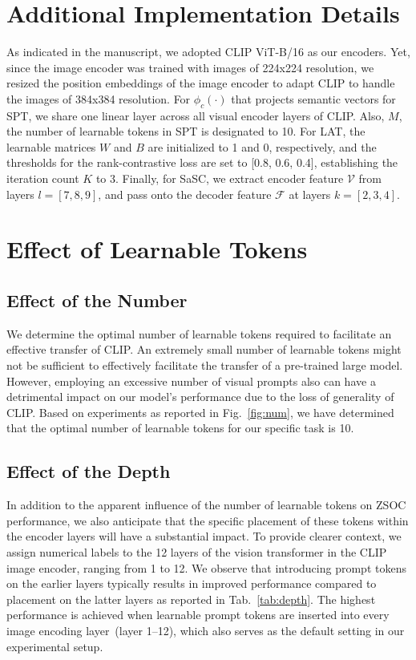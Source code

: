 \appendix

\section{Additional Implementation Details}
As indicated in the manuscript, we adopted CLIP ViT-B/16 as our encoders.
Yet, since the image encoder was trained with images of 224x224 resolution, we resized the position embeddings of the image encoder to adapt CLIP to handle the images of 384x384 resolution.
For $\phi_c(\cdot)$ that projects semantic vectors for SPT, we share one linear layer across all visual encoder layers of CLIP.
Also, $M$, the number of learnable tokens in SPT is designated to 10.
For LAT, the learnable matrices $W$ and $B$ are initialized to 1 and 0, respectively, and the thresholds for the rank-contrastive loss are set to [0.8, 0.6, 0.4], establishing the iteration count $K$ to 3.
Finally, for SaSC, we extract encoder feature $\mathcal{V}$ from layers $l = [7,8,9]$, and pass onto the decoder feature $\mathcal{F}$ at layers $k = [2,3,4]$.


\section{Effect of Learnable Tokens}

\subsection{Effect of the Number}
We determine the optimal number of learnable tokens required to facilitate an effective transfer of CLIP.
An extremely small number of learnable tokens might not be sufficient to effectively facilitate the transfer of a pre-trained large model.
However, employing an excessive number of visual prompts also can have a detrimental impact on our model's performance due to the loss of generality of CLIP.
Based on experiments as reported in Fig.~\ref{fig:num}, we have determined that the optimal number of learnable tokens for our specific task is 10.

\subsection{Effect of the Depth}
In addition to the apparent influence of the number of learnable tokens on ZSOC performance, we also anticipate that the specific placement of these tokens within the encoder layers will have a substantial impact.
To provide clearer context, we assign numerical labels to the 12 layers of the vision transformer in the CLIP image encoder, ranging from 1 to 12.
We observe that introducing prompt tokens on the earlier layers typically results in improved performance compared to placement on the latter layers as reported in Tab.~\ref{tab:depth}.
The highest performance is achieved when learnable prompt tokens are inserted into every image encoding layer~(layer 1--12), which also serves as the default setting in our experimental setup.


